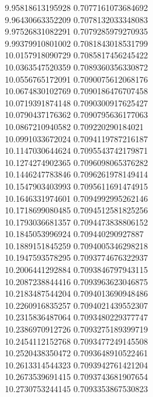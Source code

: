 {9.95818613195928 0.7077161073684692 \\
9.96430663352209 0.7078132033348083 \\
9.97526831082291 0.7079285979270935 \\
9.99379910801002 0.7081843018531799 \\
10.0157918090729 0.7085817456245422 \\
10.0363547520359 0.7089360356330872 \\
10.0556765172091 0.7090075612068176 \\
10.0674830102769 0.7090186476707458 \\
10.0719391874148 0.7090300917625427 \\
10.0790437176362 0.7090795636177063 \\
10.0867210940582 0.709220290184021 \\
10.0991033672024 0.7094119787216187 \\
10.1147030644624 0.7095543742179871 \\
10.1274274902365 0.7096098065376282 \\
10.1446247783846 0.7096261978149414 \\
10.1547903403993 0.7095611691474915 \\
10.1646331974601 0.7094992995262146 \\
10.1718699080485 0.7094512581825256 \\
10.1793036681357 0.7094473838806152 \\
10.1845053996924 0.709440290927887 \\
10.1889151845259 0.7094005346298218 \\
10.1947593578295 0.7093774676322937 \\
10.2006441292884 0.7093846797943115 \\
10.2087238844416 0.7093963623046875 \\
10.2183487544204 0.7094013690948486 \\
10.2260916835257 0.7094021439552307 \\
10.2315836487064 0.7093480229377747 \\
10.2386970912726 0.7093275189399719 \\
10.2454112152768 0.7093477249145508 \\
10.2520438350472 0.7093648910522461 \\
10.2613314544323 0.7093942761421204 \\
10.2673539691415 0.7093743681907654 \\
10.2730753244145 0.7093353867530823 \\
}
